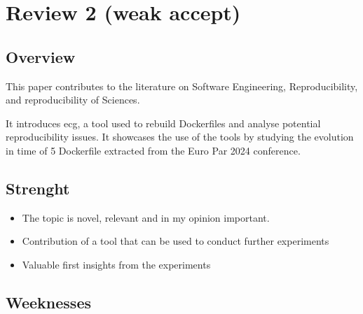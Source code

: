 \documentclass[%
	11pt,
	final,
]{article}
\begin{document}
\section{Review 2 (weak accept)}

\subsection{Overview}

This paper contributes to the literature on Software Engineering, Reproducibility, and reproducibility of Sciences.

It introduces ecg, a tool used to rebuild Dockerfiles and analyse potential reproducibility issues.
It showcases the use of the tools by studying the evolution in time of 5 Dockerfile extracted from the Euro Par 2024 conference.

\subsection{Strenght}

\begin{itemize}
\item The topic is novel, relevant and in my opinion important. 
\item Contribution of a tool that can be used to conduct further experiments
\item Valuable first insights from the experiments
\end{itemize}

\subsection{Weeknesses}
 
\end{document}
